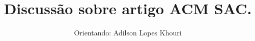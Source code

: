 \documentclass[compress, hyperref={pdfpagelayout=SinglePage}]{beamer}
\title[Artigo]{Discussão sobre artigo ACM SAC.}
\author{Orientando: Adilson Lopes Khouri}
\institute[USP]{Orientador: Prof. Dr. Luciano Antonio Digiampietri}
\begin{document}
\begin{frame}
  \titlepage
\end{frame}



\newpage

\newpage

\end{document}
